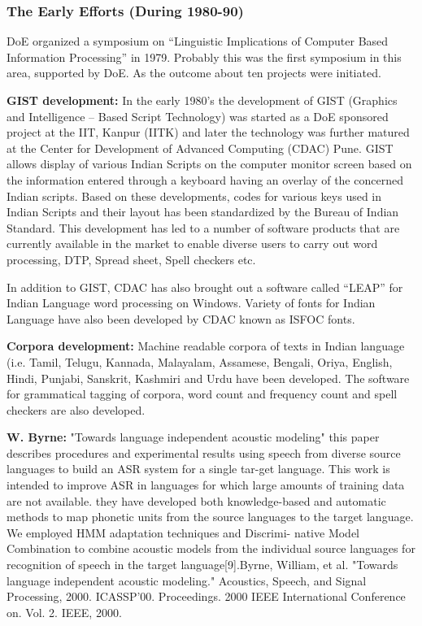 \documentclass[12pt,a4paper,oldfontcommands]{memoir}
\begin{document}
\subsubsection{The Early Efforts (During 1980-90)}
DoE organized a symposium on “Linguistic Implications of Computer Based
Information Processing” in 1979. Probably this was the first symposium in this area,
supported by DoE. As the outcome about ten projects were initiated.

\textbf{GIST development:} In the early 1980’s the development of GIST (Graphics and
Intelligence – Based Script Technology) was started as a DoE sponsored project at the
IIT, Kanpur (IITK) and later the technology was further matured at the Center for
Development of Advanced Computing (CDAC) Pune. GIST allows display of various
Indian Scripts on the computer monitor screen based on the information entered
through a keyboard having an overlay of the concerned Indian scripts. Based on these
developments, codes for various keys used in Indian Scripts and their layout has been
standardized by the Bureau of Indian Standard. This development has led to a number
of software products that are currently available in the market to enable diverse users
to carry out word processing, DTP, Spread sheet, Spell checkers etc\cite{23}.

In addition to GIST, CDAC has also brought out a software called “LEAP” for Indian
Language word processing on Windows. Variety of fonts for Indian Language have
also been developed by CDAC known as ISFOC fonts.

\textbf{Corpora development:} Machine readable corpora of texts in Indian language
(i.e. Tamil, Telugu, Kannada, Malayalam, Assamese, Bengali, Oriya, English,
Hindi, Punjabi, Sanskrit, Kashmiri and Urdu have been developed.
The software for grammatical tagging of corpora, word count and frequency count
and spell checkers are also developed.

\textbf{W. Byrne:} "Towards language independent acoustic modeling" this paper describes procedures and experimental results using speech from
diverse source languages to build an ASR system for a single tar-get language. This work is intended to improve ASR in languages
for which large amounts of training data are not available. they have developed both knowledge-based and automatic methods to
map phonetic units from the source languages to the target language. We employed HMM adaptation techniques and Discrimi-
native Model Combination to combine acoustic models from the individual source languages for recognition of speech in the target language[9].Byrne, William, et al. "Towards language independent acoustic modeling." Acoustics, Speech, and Signal Processing, 2000. ICASSP'00. Proceedings. 2000 IEEE International Conference on. Vol. 2. IEEE, 2000\cite{7}.
\end{document}
